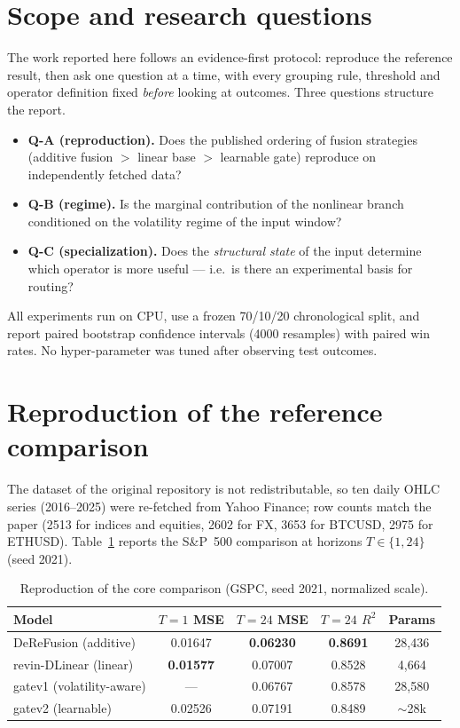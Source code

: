 \documentclass[preprint,12pt]{elsarticle}
\begin{document}
\section{Scope and research questions}
\label{sec:intro}

The work reported here follows an evidence-first protocol: reproduce the reference result,
then ask one question at a time, with every grouping rule, threshold and operator definition
fixed \emph{before} looking at outcomes. Three questions structure the report.

\begin{itemize}
\item \textbf{Q-A (reproduction).} Does the published ordering of fusion strategies
(additive fusion $>$ linear base $>$ learnable gate) reproduce on independently fetched data?
\item \textbf{Q-B (regime).} Is the marginal contribution of the nonlinear branch conditioned on
the volatility regime of the input window?
\item \textbf{Q-C (specialization).} Does the \emph{structural state} of the input determine
which operator is more useful --- i.e.\ is there an experimental basis for routing?
\end{itemize}

All experiments run on CPU, use a frozen 70/10/20 chronological split, and report paired
bootstrap confidence intervals (4000 resamples) with paired win rates. No hyper-parameter was
tuned after observing test outcomes.

\section{Reproduction of the reference comparison}
\label{sec:repro}

The dataset of the original repository is not redistributable, so ten daily OHLC series
(2016--2025) were re-fetched from Yahoo Finance; row counts match the paper (2513 for indices
and equities, 2602 for FX, 3653 for BTCUSD, 2975 for ETHUSD). Table~\ref{tab:repro} reports the
S\&P~500 comparison at horizons $T\in\{1,24\}$ (seed 2021).

\begin{table}[!t]
\centering
\small
\caption{Reproduction of the core comparison (GSPC, seed 2021, normalized scale).}
\label{tab:repro}
\begin{tabular}{@{}lcccc@{}}
\toprule
Model & $T{=}1$ MSE & $T{=}24$ MSE & $T{=}24$ $R^2$ & Params \\
\midrule
DeReFusion (additive)      & 0.01647 & \textbf{0.06230} & \textbf{0.8691} & 28{,}436 \\
revin-DLinear (linear)     & \textbf{0.01577} & 0.07007 & 0.8528 & 4{,}664 \\
gatev1 (volatility-aware)  & ---     & 0.06767 & 0.8578 & 28{,}580 \\
gatev2 (learnable)         & 0.02526 & 0.07191 & 0.8489 & $\sim$28k \\
\bottomrule
\end{tabular}
\end{table}
\end{document}
